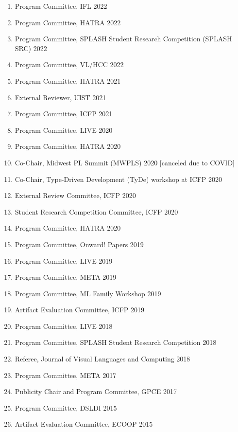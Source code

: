 \documentclass[10pt,letterpaper]{article}
\begin{document}
\begin{enumerate}
  \item Program Committee, IFL 2022
  \item Program Committee, HATRA 2022
  \item Program Committee, SPLASH Student Research Competition (SPLASH SRC) 2022
  \item Program Committee, VL/HCC 2022
  \item Program Committee, HATRA 2021
  \item External Reviewer, UIST 2021
  \item Program Committee, ICFP 2021
  \item Program Committee, LIVE 2020
  \item Program Committee, HATRA 2020
  \item Co-Chair, Midwest PL Summit (MWPLS) 2020 [canceled due to COVID]
  \item Co-Chair, Type-Driven Development (TyDe) workshop at ICFP 2020
  \item External Review Committee, ICFP 2020
  \item Student Research Competition Committee, ICFP 2020
  \item Program Committee, HATRA 2020
  \item Program Committee, Onward! Papers 2019
  \item Program Committee, LIVE 2019
  \item Program Committee, META 2019
  \item Program Committee, ML Family Workshop 2019
  \item Artifact Evaluation Committee, ICFP 2019
  \item Program Committee, LIVE 2018
  \item Program Committee, SPLASH Student Research Competition 2018
  \item Referee, Journal of Visual Languages and Computing 2018
  \item Program Committee, META 2017
  \item Publicity Chair and Program Committee, GPCE 2017
  \item Program Committee, DSLDI 2015
  \item Artifact Evaluation Committee, ECOOP 2015
\end{enumerate}
\end{document}
